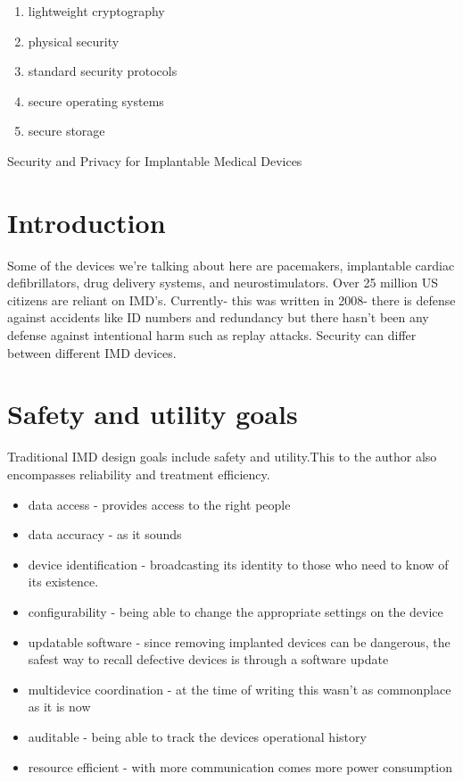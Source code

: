 \documentclass{article}
\begin{document}
\begin{enumerate}
\begin{enumerate}
\item lightweight cryptography
\item physical security
\item standard security protocols
\item secure operating systems
\item secure storage
\end{enumerate}

\end{enumerate}

\newpage
\begin{center}
\LARGE Security and Privacy for Implantable Medical Devices
\end{center}
\section*{Introduction}
Some of the devices we're talking about here are pacemakers, implantable cardiac defibrillators, drug delivery systems, and neurostimulators. Over 25 million US citizens are reliant on IMD's. Currently- this was written in 2008- there is defense against accidents like ID numbers and redundancy but there hasn't been any defense against intentional harm such as replay attacks. Security can differ between different IMD devices. 

\section*{Safety and utility goals}
Traditional IMD design goals include safety and utility.This to the author also encompasses reliability and treatment efficiency.
\begin{itemize}
\item data access - provides access to the right people
\item data accuracy - as it sounds
\item device identification - broadcasting its identity to those who need to know of its existence. 
\item configurability - being able to change the appropriate settings on the device
\item updatable software - since removing implanted devices can be dangerous, the safest way to recall defective devices is through a software update
\item multidevice coordination - at the time of writing this wasn't as commonplace as it is now
\item auditable - being able to track the devices operational history
\item resource efficient - with more communication comes more power consumption
\end{itemize}
\end{document}
